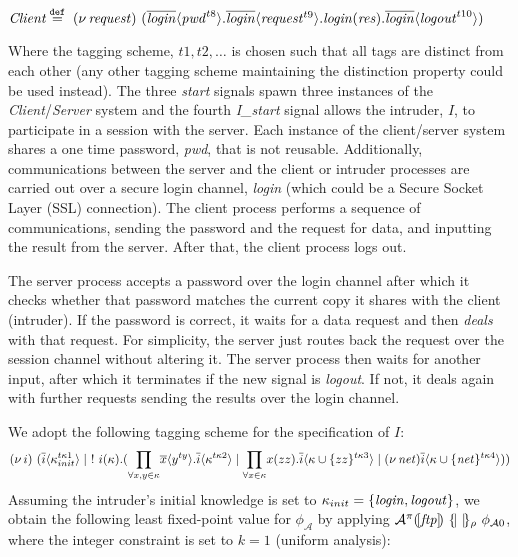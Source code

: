 \documentclass[10pt,a4paper,final,oneside,fleqn]{book}
\newcommand*{\eqdef}{\mathbin{\mathop{=}\limits^{\texttt{def}}}}
\begin{document}
\noindent
$\mbox{{\itshape Client\/}}\eqdef~(\nu~\!\mbox{{\itshape request\/}})~(\overline{\mbox{{\itshape login\/}}}\langle\mbox{{\itshape pwd\/}}^{t8}\rangle.\overline{\mbox{{\itshape login\/}}}\langle\mbox{{\itshape request\/}}^{t9}\rangle.\mbox{{\itshape login\/}}(\mbox{{\itshape res\/}}).\overline{\mbox{{\itshape login\/}}}\langle\mbox{{\itshape logout\/}}^{t10}\rangle)$\vspace{5mm}

\noindent
Where the tagging scheme, $t1, t2, \ldots$ is chosen such that all tags are distinct from each other (any other tagging scheme maintaining the distinction property could be used instead).  The three {\itshape start\/} signals spawn three instances of the {\itshape Client\/}/{\itshape Server\/} system and the fourth {\itshape I\_start\/} signal allows the intruder, $I$, to participate in a session with the server. Each instance of the client/server system shares a one time password, {\itshape pwd\/}, that is not reusable.  Additionally, communications between the server and the client or intruder processes are carried out over a secure login channel, {\itshape login\/} (which could be a Secure Socket Layer (SSL) connection).  The client process performs a sequence of communications, sending the password and the request for data, and inputting the result from the server. After that, the client process logs out.

The server process accepts a password over the login channel after which it checks whether that password matches the current copy it shares with the client (intruder).  If the password is correct, it waits for a data request and then {\itshape deals\/} with that request.  For simplicity, the server just routes back the request over the session channel without altering it. The server process then waits for another input, after which it terminates if the new signal is {\itshape logout\/}.  If not, it deals again with further requests sending the results over the login channel.

We adopt the following tagging scheme for the specification of $I$:
\[(\nu~\!i)~(\overline{i}\langle\kappa_{init}^{t\kappa1}\rangle\mid~!~i(\kappa).(\underset{\forall x,y\in\kappa}\prod\overline{x}\langle y^{ty}\rangle.\overline{i}\langle\kappa^{t\kappa2}\rangle\mid\underset{\forall x\in\kappa}\prod x(zz).\overline{i}\langle\kappa\cup \{zz\}^{t\kappa3}\rangle\mid(\nu~\!\mbox{{\itshape net\/}})\overline{i}\langle\kappa\cup\{\mbox{{\itshape net\/}}\}^{t\kappa4}\rangle))\]
Assuming the intruder's initial knowledge is set to $\kappa_{init}=\{\mbox{{\itshape login\/}},\mbox{{\itshape logout\/}}\}$, we obtain the following least fixed-point value for $\phi_\mathcal{A}$ by applying $\mathcal{A}^\pi(\![\mbox{{\itshape ftp\/}}]\!)~\{\!|~|\!\}_\rho~\phi_{\mathcal{A}0}$, where the integer constraint is set to $k=1$ (uniform analysis):\vspace{6mm}
\end{document}
